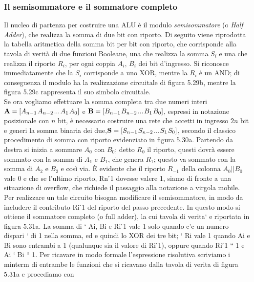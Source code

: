 \documentclass[a4paper]{extarticle}
\begin{document}
\subsubsection{Il semisommatore e il sommatore completo}
Il nucleo di partenza per costruire una ALU è il modulo \textit{semisommatore} (o \textit{Half Adder}), che realizza la somma di due bit con riporto. Di seguito viene riprodotta la tabella aritmetica della somma bit per bit con riporto, che corrisponde alla tavola di verità di due funzioni Booleane, una che realizza la somma \(S_i\) e una che realizza il riporto \(R_i\), per ogni coppia \(A_i\), \(B_i\) dei bit d’ingresso. Si riconosce immediatamente che la \(S_i\) corrisponde a uno XOR, mentre la \(R_i\) è un AND; di conseguenza il modulo ha la realizzazione circuitale di figura 5.29b, mentre la
figura 5.29c rappresenta il suo simbolo circuitale.\\
Se ora vogliamo effettuare la somma completa tra due numeri interi \(\textbf{A} = \left[ A_{n - 1} \hspace{0.1em} A_{n - 2} \hspace{0.1em} ... \hspace{0.1em} A_1 \hspace{0.1em} A_0 \right]\) e \(\textbf{B} = \left[ B_{n - 1} \hspace{0.1em} B_{n - 2} \hspace{0.1em} ... \hspace{0.1em} B_1 \hspace{0.1em} B_0 \right]\), espressi in notazione posizionale con \(n\) bit, è necessario costruire una rete che accetti in ingresso \(2n\) bit e generi la somma binaria dei due,\(\textbf{S} = \left[ S_{n - 1} \hspace{0.1em} S_{n - 2} \hspace{0.1em} ... \hspace{0.1em} S_1 \hspace{0.1em} S_0 \right]\), secondo il classico procedimento di somma con riporto evidenziato in figura 5.30a. Partendo da destra si inizia a sommare \(A_0\) con \(B_0\); detto \(R_0\) il riporto, questi dovrà essere sommato con la somma di \(A_1\) e \(B_1\), che genera \(R_1\); questo va sommato con la somma di \(A_2\) e \(B_2\) e così via. È evidente che il riporto \(R_{-1}\) della colonna \(A_0 || B_0\) vale \(0\) e che se l’ultimo riporto, Rn ́1
dovesse valere 1, siamo di fronte a una situazione di overflow, che richiede il passaggio alla notazione a virgola
mobile. Per realizzare un tale circuito bisogna modificare il semisommatore, in modo da includere il contributo
Ri ́1 del riporto del passo precedente. In questo modo si ottiene il sommatore completo (o full adder), la cui
tavola di verita` e riportata in figura 5.31a. La somma di ` Ai, Bi e Ri ́1 vale 1 solo quando c’e un numero dispari `
di 1 nella somma, ed e quindi lo XOR dei tre bit; ` Ri vale 1 quando Ai e Bi sono entrambi a 1 (qualunque sia il
valore di Ri ́1), oppure quando Ri ́1 “ 1 e Ai ‘ Bi “ 1. Per ricavare in modo formale l’espressione risolutiva
scriviamo i minterm di entrambe le funzioni che si ricavano dalla tavola di verita di figura 5.31a e procediamo con
\end{document}
